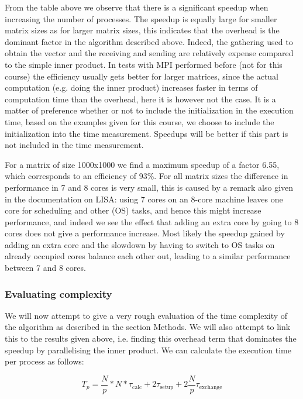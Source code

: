 \documentclass[11pt,a4paper,onecolumn]{article}
\begin{document}
From the table above we observe that there is a significant speedup when increasing the number of processes. The speedup is equally large for smaller matrix sizes as for larger matrix sizes, this indicates that the overhead is the dominant factor in the algorithm described above. Indeed, the gathering used to obtain the vector and the receiving and sending are relatively expense compared to the simple inner product. In tests with MPI performed before (not for this course) the efficiency usually gets better for larger matrices, since the actual computation (e.g. doing the inner product) increases faster in terms of computation time than the overhead, here it is however not the case. It is a matter of preference whether or not to include the initialization in the execution time, based on the examples given for this course, we choose to include the initialization into the time measurement. Speedups will be better if this part is not included in the time measurement. 

For a matrix of size 1000x1000 we find a maximum speedup of a factor 6.55, which corresponds to an efficiency of 93\%. For all matrix sizes the difference in performance in 7 and 8 cores is very small, this is caused by a remark also given in the documentation on LISA: using 7 cores on an 8-core machine leaves one core for scheduling and other (OS) tasks, and hence this might increase performance, and indeed we see the effect that adding an extra core by going to 8 cores does not give a performance increase. Most likely the speedup gained by adding an extra core and the slowdown by having to switch to OS tasks on already occupied cores balance each other out, leading to a similar performance between 7 and 8 cores. 

\subsubsection{Evaluating complexity}
We will now attempt to give a very rough evaluation of the time complexity of the algorithm as described in the section Methods. We will also attempt to link this to the results given above, i.e. finding this overhead term that dominates the speedup by parallelising the inner product. We can calculate the execution time per process as follows:

\begin{equation}
  T_p = \frac{N}{p} * N * \tau_{\text{calc}} + 2\tau_{\text{setup}} + 2\frac{N}{p}\tau_{\text{exchange}}
\end{equation}
 
\end{document}
